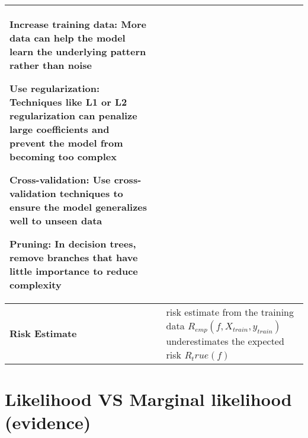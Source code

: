 \begin{longtable}{|p{3cm}|p{6cm}|p{6cm}|}
{        \item \textbf{Increase training data}: More data can help the model learn the underlying pattern rather than noise
        
        \item \textbf{Use regularization}: Techniques like L1 or L2 regularization can penalize large coefficients and prevent the model from becoming too complex
        
        \item \textbf{Cross-validation}: Use cross-validation techniques to ensure the model generalizes well to unseen data
        
        \item \textbf{Pruning}: In decision trees, remove branches that have little importance to reduce complexity
    }\\
    \hline


    \textbf{Risk Estimate} \cite{mfml-1} & & risk estimate from the training data $R_{emp}(f, X_{train}, y_{train})$ underestimates the expected risk $R_true(f)$\\
    \hline



\end{longtable}



\section{Likelihood VS Marginal likelihood (evidence) \cite{chatgpt}} \label{Likelihood VS Marginal likelihood (evidence)}

